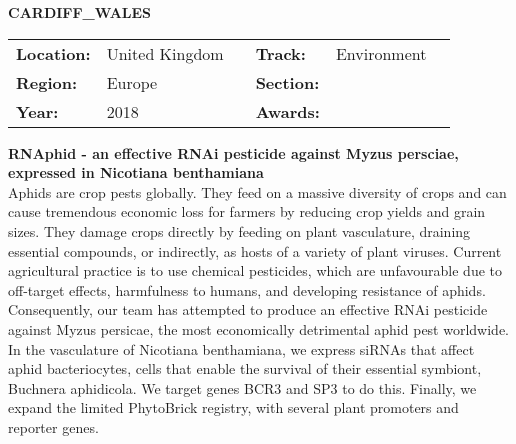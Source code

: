 \textbf{\uppercase{Cardiff\_Wales}}
\FloatBarrier
\begin{table}[h]
\begin{tabular}{lp{2.5cm}llll}
\textbf{Location:} & United Kingdom & \multicolumn{1}{|l}{} & \textbf{Track:}   & Environment \\
\textbf{Region:}   & Europe   & \multicolumn{1}{|l}{} & \textbf{Section:} &  \\
\textbf{Year:}     & 2018   & \multicolumn{1}{|l}{} & \textbf{Awards:}  &
\end{tabular}
\end{table}
\FloatBarrier
\noindent	\textbf{RNAphid - an effective RNAi pesticide against Myzus persciae, expressed in Nicotiana benthamiana} \vspace{.2cm}\\
Aphids are crop pests globally. They feed on a massive diversity of crops and can cause tremendous economic loss for farmers by reducing crop yields and grain sizes. They damage crops directly by feeding on plant vasculature, draining essential compounds, or indirectly, as hosts of a variety of plant viruses. Current agricultural practice is to use chemical pesticides, which are unfavourable due to off-target effects, harmfulness to humans, and developing resistance of aphids. Consequently, our team has attempted to produce an effective RNAi pesticide against Myzus persicae, the most economically detrimental aphid pest worldwide. In the vasculature of Nicotiana benthamiana, we express siRNAs that affect aphid bacteriocytes, cells that enable the survival of their essential symbiont, Buchnera aphidicola. We target genes BCR3 and SP3 to do this. Finally, we expand the limited PhytoBrick registry, with several plant promoters and reporter genes.
\vspace{2cm} $ $
\pagebreak

